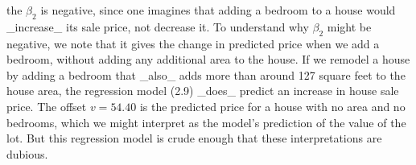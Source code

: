the \(\beta_{2}\) is negative, since one imagines that adding a bedroom to a house would _increase_ its sale price, not decrease it. To understand why \(\beta_{2}\) might be negative, we note that it gives the change in predicted price when we add a bedroom, without adding any additional area to the house. If we remodel a house by adding a bedroom that _also_ adds more than around 127 square feet to the house area, the regression model (2.9) _does_ predict an increase in house sale price. The offset \(v=54.40\) is the predicted price for a house with no area and no bedrooms, which we might interpret as the model's prediction of the value of the lot. But this regression model is crude enough that these interpretations are dubious.

 